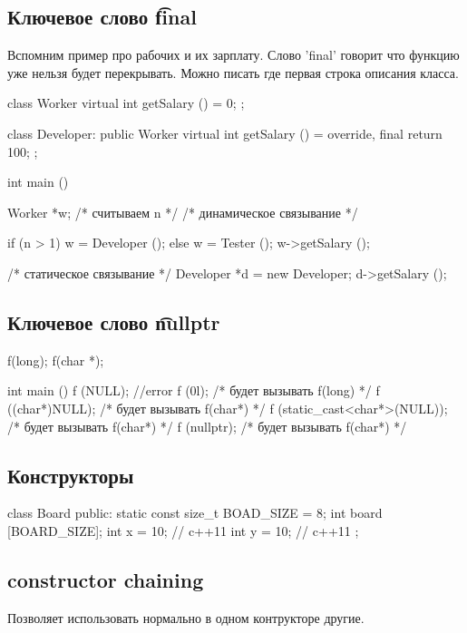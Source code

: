 \subsection{Ключевое слово \t{final}}

Вспомним пример про рабочих и их зарплату.
Слово \cpp'final' говорит что функцию уже нельзя будет перекрывать.
Можно писать где первая строка описания класса.
\begin{cppcode}

class Worker {
	virtual int getSalary () = 0;
};

class Developer: public Worker {
	virtual int getSalary () = override, final {
		return 100;
	}
};

int main () {
	Worker *w;
	/* считываем n */
	/* динамическое связывание */

	if (n > 1)
		w = Developer ();
	else
		w = Tester ();
	w->getSalary ();

	/* статическое связывание */
	Developer *d = new Developer;
	d->getSalary ();
}
\end{cppcode}

\subsection{Ключевое слово \t{nullptr}}

\begin{cppcode}
f(long);
f(char *);

int main () {
	f (NULL); //error
	f (0l); /* будет вызывать f(long) */
	f ((char*)NULL); /* будет вызывать f(char*) */
	f (static_cast<char*>(NULL)); /* будет вызывать f(char*) */
	f (nullptr); /* будет вызывать f(char*) */
}
\end{cppcode}

\subsection{Конструкторы}

\begin{cppcode}
class Board {
public:
	static const size_t BOAD_SIZE = 8;
	int board [BOARD_SIZE];
	int x = 10; // c++11
	int y = 10; // c++11
};
\end{cppcode}

\subsection{constructor chaining}

Позволяет использовать нормально в одном контрукторе другие.

